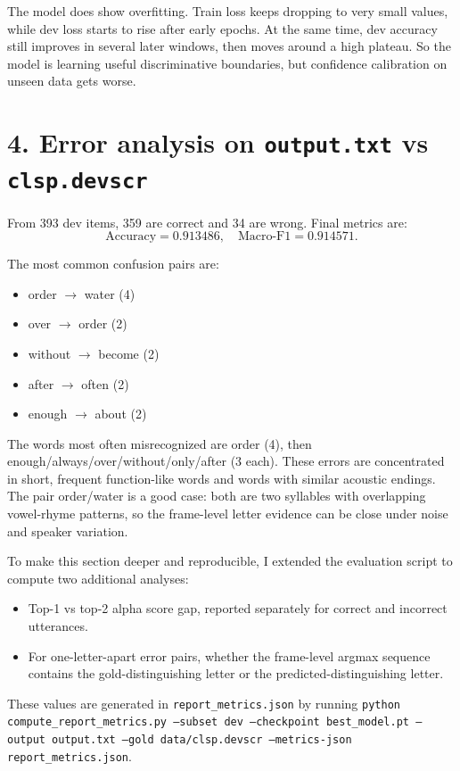 \documentclass[11pt]{article}
\begin{document}
The model does show overfitting.
Train loss keeps dropping to very small values, while dev loss starts to rise after early epochs.
At the same time, dev accuracy still improves in several later windows, then moves around a high plateau.
So the model is learning useful discriminative boundaries, but confidence calibration on unseen data gets worse.

\section*{4. Error analysis on \texttt{output.txt} vs \texttt{clsp.devscr}}
From 393 dev items, 359 are correct and 34 are wrong.
Final metrics are:
\[
\text{Accuracy} = 0.913486, \quad \text{Macro-F1} = 0.914571.
\]

The most common confusion pairs are:
\begin{itemize}
    \item order $\rightarrow$ water (4)
    \item over $\rightarrow$ order (2)
    \item without $\rightarrow$ become (2)
    \item after $\rightarrow$ often (2)
    \item enough $\rightarrow$ about (2)
\end{itemize}

The words most often misrecognized are order (4), then enough/always/over/without/only/after (3 each).
These errors are concentrated in short, frequent function-like words and words with similar acoustic endings.
The pair order/water is a good case: both are two syllables with overlapping vowel-rhyme patterns, so the frame-level letter evidence can be close under noise and speaker variation.

To make this section deeper and reproducible, I extended the evaluation script to compute two additional analyses:
\begin{itemize}
    \item Top-1 vs top-2 alpha score gap, reported separately for correct and incorrect utterances.
    \item For one-letter-apart error pairs, whether the frame-level argmax sequence contains the gold-distinguishing letter or the predicted-distinguishing letter.
\end{itemize}
These values are generated in \texttt{report\_metrics.json} by running
\texttt{python compute\_report\_metrics.py --subset dev --checkpoint best\_model.pt --output output.txt --gold data/clsp.devscr --metrics-json report\_metrics.json}.
\end{document}
